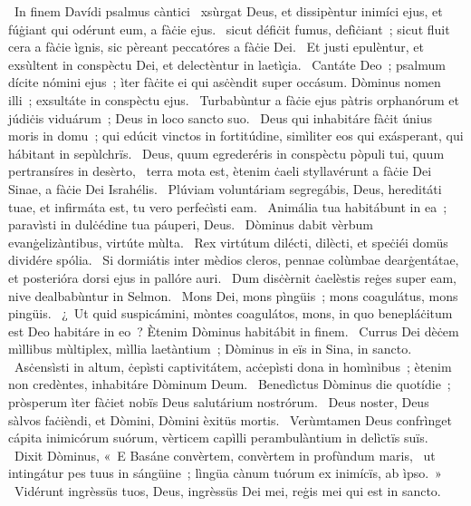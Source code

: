 {~In finem Davídi psalmus càntici}
{%
~xsùrgat Deus, et dissipèntur inimíci ejus, et fúġiant qui odérunt eum, a fàċie ejus.
~sicut défiċit fumus, defìċiant~; sicut fluit cera a fàċie ìgnis, sic pèreant peccatóres a fàċie Dei.
~Et justi epulèntur, et exsùltent in conspèctu Dei, et delectèntur in laetìçia.
~Cantáte Deo~; psalmum dícite nómini ejus~; ìter fàċite ei qui asċèndit super occásum. Dòminus nomen illi~; exsultáte in conspèctu ejus.
~Turbabùntur a fàċie ejus pàtris orphanórum et júdiċis viduárum~; Deus in loco sancto suo.
~Deus qui inhabitáre fàċit únius moris in domu~; qui edúcit vinctos in fortitúdine, simìliter eos qui exásperant, qui hábitant in sepùlchrïs.
~Deus, quum egrederéris in conspèctu pòpuli tui, quum pertransíres in desèrto,
~terra mota est, ètenim ċaeli styllavérunt a fàċie Dei Sinae, a fàċie Dei Israhélis.
~Plúviam voluntáriam segregábis, Deus, hereditáti tuae, et infirmáta est, tu vero perfeċìsti eam.
~Animália tua habitábunt in ea~; paravìsti in dulċédine tua páuperi, Deus.
~Dòminus dabit vèrbum evanġelizàntibus, virtúte mùlta.
~Rex virtútum dilécti, dilècti, et speċiéi domüs dividére spólia.
~Si dormiátis inter mèdios cleros, pennae colùmbae dearġentátae, et posterióra dorsi ejus in pallóre auri.
~Dum disċèrnit ċaelèstis reġes super eam, nive dealbabùntur in Selmon.
~Mons Dei, mons pìngüis~; mons coagulátus, mons pingüis.
~¿~Ut quid suspicámini, mòntes coagulátos, mons, in quo benepláċitum est Deo habitáre in eo~? Ètenim Dòminus habitábit in finem.
~Currus Dei dèċem mìllibus mùltiplex, mìllia laetàntium~; Dòminus in eïs in Sina, in sancto.
~Asċensìsti in altum, ċepìsti captivitátem, acċepìsti dona in homìnibus~; ètenim non credèntes, inhabitáre Dòminum Deum.
~Benedìctus Dòminus die quotídie~; pròsperum ìter fàċiet nobïs Deus salutárium nostrórum.
~Deus noster, Deus sàlvos faċièndi, et Dòmini, Dòmini èxitüs mortis.
~Verùmtamen Deus confrìnget cápita inimicórum suórum, vèrticem capìlli perambulàntium in delìctïs suïs.
~Dixit Dòminus, «~E Basáne convèrtem, convèrtem in profùndum maris,
~ut intingátur pes tuus in sángüine~; lìngüa cànum tuórum ex inimícïs, ab ìpso.~»
~Vidérunt ingrèssüs tuos, Deus, ingrèssüs Dei mei, reġis mei qui est in sancto.
}
